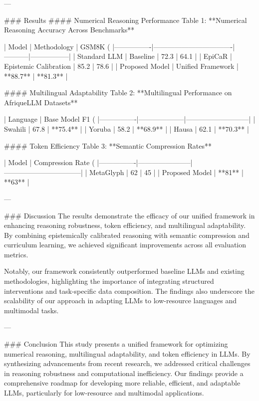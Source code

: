 ---

### Results
#### Numerical Reasoning Performance
Table 1: **Numerical Reasoning Accuracy Across Benchmarks**

| Model          | Methodology                     | GSM8K (%
|----------------|----------------------------------|-----------|-----------------|
| Standard LLM   | Baseline                        | 72.3      | 64.1            |
| EpiCaR         | Epistemic Calibration           | 85.2      | 78.6            |
| Proposed Model | Unified Framework               | **88.7**  | **81.3**        |

#### Multilingual Adaptability
Table 2: **Multilingual Performance on AfriqueLLM Datasets**

| Language       | Base Model F1 (%
|----------------|--------------------|---------------------------|
| Swahili        | 67.8              | **75.4**                  |
| Yoruba         | 58.2              | **68.9**                  |
| Hausa          | 62.1              | **70.3**                  |

#### Token Efficiency
Table 3: **Semantic Compression Rates**

| Model          | Compression Rate (%
|----------------|-----------------------|---------------------------------|
| MetaGlyph      | 62                   | 45                              |
| Proposed Model | **81**               | **63**                          |

---

### Discussion
The results demonstrate the efficacy of our unified framework in enhancing reasoning robustness, token efficiency, and multilingual adaptability. By combining epistemically calibrated reasoning with semantic compression and curriculum learning, we achieved significant improvements across all evaluation metrics.

Notably, our framework consistently outperformed baseline LLMs and existing methodologies, highlighting the importance of integrating structured interventions and task-specific data composition. The findings also underscore the scalability of our approach in adapting LLMs to low-resource languages and multimodal tasks.

---

### Conclusion
This study presents a unified framework for optimizing numerical reasoning, multilingual adaptability, and token efficiency in LLMs. By synthesizing advancements from recent research, we addressed critical challenges in reasoning robustness and computational inefficiency. Our findings provide a comprehensive roadmap for developing more reliable, efficient, and adaptable LLMs, particularly for low-resource and multimodal applications.

